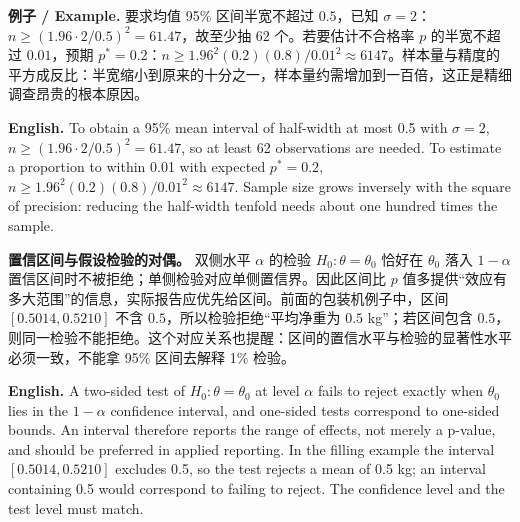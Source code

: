 \documentclass[UTF8,11pt,a4paper]{ctexart}
\newcommand{\EN}[1]{\par\noindent\textbf{English.} #1\par}
\newcommand{\EX}[2]{\par\noindent\textbf{例子 / Example.} #1\par\EN{#2}}
\begin{document}
\EX{要求均值 95\% 区间半宽不超过 $0.5$，已知 $\sigma=2$：$n\ge(1.96\cdot2/0.5)^2=61.47$，故至少抽 $62$ 个。若要估计不合格率 $p$ 的半宽不超过 $0.01$，预期 $p^*=0.2$：$n\ge1.96^2(0.2)(0.8)/0.01^2\approx6147$。样本量与精度的平方成反比：半宽缩小到原来的十分之一，样本量约需增加到一百倍，这正是精细调查昂贵的根本原因。}{To obtain a 95\% mean interval of half-width at most 0.5 with $\sigma=2$, $n\ge(1.96\cdot2/0.5)^2=61.47$, so at least 62 observations are needed. To estimate a proportion to within 0.01 with expected $p^*=0.2$, $n\ge1.96^2(0.2)(0.8)/0.01^2\approx6147$. Sample size grows inversely with the square of precision: reducing the half-width tenfold needs about one hundred times the sample.}

\noindent\textbf{置信区间与假设检验的对偶。} 双侧水平 $\alpha$ 的检验 $H_0:\theta=\theta_0$ 恰好在 $\theta_0$ 落入 $1-\alpha$ 置信区间时不被拒绝；单侧检验对应单侧置信界。因此区间比 $p$ 值多提供“效应有多大范围”的信息，实际报告应优先给区间。前面的包装机例子中，区间 $[0.5014,0.5210]$ 不含 $0.5$，所以检验拒绝“平均净重为 $0.5$ kg”；若区间包含 $0.5$，则同一检验不能拒绝。这个对应关系也提醒：区间的置信水平与检验的显著性水平必须一致，不能拿 95\% 区间去解释 1\% 检验。
\EN{A two-sided test of $H_0:\theta=\theta_0$ at level $\alpha$ fails to reject exactly when $\theta_0$ lies in the $1-\alpha$ confidence interval, and one-sided tests correspond to one-sided bounds. An interval therefore reports the range of effects, not merely a p-value, and should be preferred in applied reporting. In the filling example the interval $[0.5014,0.5210]$ excludes 0.5, so the test rejects a mean of 0.5 kg; an interval containing 0.5 would correspond to failing to reject. The confidence level and the test level must match.}
\end{document}
